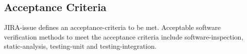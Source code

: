 \subsection{Acceptance Criteria}
JIRA-issue defines an \gls{acceptance-criteria} to be met. Acceptable software
verification methods to meet the acceptance criteria include
\gls{software-inspection}, \gls{static-analysis}, \gls{testing-unit} and
\gls{testing-integration}. 
